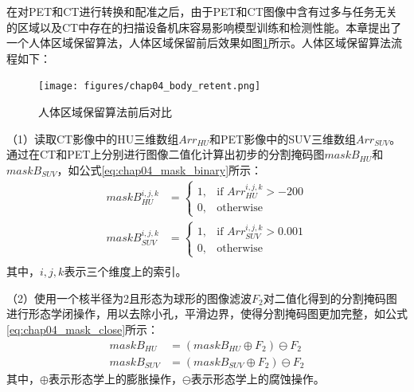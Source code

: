 在对PET和CT进行转换和配准之后，由于PET和CT图像中含有过多与任务无关的区域以及CT中存在的扫描设备机床容易影响模型训练和检测性能。本章提出了一个人体区域保留算法，人体区域保留前后效果如图\ref{fig:chap04_body_retent}所示。人体区域保留算法流程如下：

\begin{figure}[htbp]
    \centering
    \texttt{[image: figures/chap04\_body\_retent.png]}
    \caption{人体区域保留算法前后对比}
    \label{fig:chap04_body_retent}
\end{figure}

（1）读取CT影像中的HU三维数组\(Arr_{HU}\)和PET影像中的SUV三维数组\(Arr_{SUV}\)。通过在CT和PET上分别进行图像二值化计算出初步的分割掩码图\(maskB_{HU}\)和\(maskB_{SUV}\)，如公式\ref{eq:chap04_mask_binary}所示：
\begin{equation}
    \begin{aligned}
        maskB_{HU}^{i, j, k}  & =
        \begin{cases}
            1 , & \text{if \(Arr_{HU}^{i, j, k} > -200\)} \\
            0 , & \text{otherwise}
        \end{cases}  \\
        maskB_{SUV}^{i, j, k} & =
        \begin{cases}
            1 , & \text{if \(Arr_{SUV}^{i, j, k} > 0.001\)} \\
            0 , & \text{otherwise}
        \end{cases} \\
    \end{aligned}
    \label{eq:chap04_mask_binary}
\end{equation}
其中，\(i,j,k\)表示三个维度上的索引。

（2）使用一个核半径为2且形态为球形的图像滤波\(F_2\)对二值化得到的分割掩码图进行形态学闭操作，用以去除小孔，平滑边界，使得分割掩码图更加完整，如公式\ref{eq:chap04_mask_close}所示：
\begin{equation}
    \begin{aligned}
        maskB_{HU}  & = (maskB_{HU} \oplus F_2 ) \ominus F_2  \\
        maskB_{SUV} & = (maskB_{SUV} \oplus F_2 ) \ominus F_2
    \end{aligned}
    \label{eq:chap04_mask_close}
\end{equation}
其中，\(\oplus\)表示形态学上的膨胀操作，\(\ominus\)表示形态学上的腐蚀操作。

